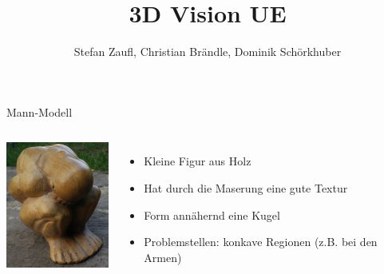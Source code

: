 \documentclass[11pt]{beamer}
\author{Stefan Zaufl, Christian Brändle, Dominik Schörkhuber}
\title{3D Vision UE}
\begin{document}
\begin{frame}
\titlepage
\end{frame}


\begin{frame}{Mann-Modell}
	\begin{columns}
		\includegraphics[width=3.5cm]{images/Mann_Original.jpg}
		\begin{itemize}
		\item Kleine Figur aus Holz
		\item Hat durch die Maserung eine gute Textur
		\item Form annähernd eine Kugel
		\item Problemstellen: konkave Regionen (z.B. bei den Armen) 
		\end{itemize}
	\end{columns}
\end{frame}
\end{document}
